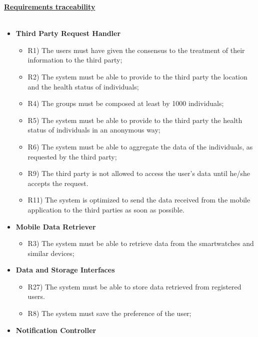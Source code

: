 	\underline{\textbf{Requirements traceability}}\\\\
	\begin{itemize}
		\item \textbf{Third Party Request Handler}
		\begin{itemize}
			\item R1) The users must have given the consensus to the treatment of their information to the third party;\\
			\item R2) The system must be able to provide to the third party the location and the health status of individuals;
			\item R4) The groups must be composed at least by 1000 individuals;\\
			\item R5) The system must be able to provide to the third party the health status of individuals in an anonymous way;\\
			\item R6) The system must be able to aggregate the data of the individuals, as requested by the third party;\\
			\item R9) The third party is not allowed to access the user’s data until he/she accepts the request.\\
			\item R11) The system is optimized to send the data received from the mobile application to the third parties as soon as possible.\\
		\end{itemize}
		\item \textbf{Mobile Data Retriever}
		\begin{itemize}
			\item R3) The system must be able to retrieve data from the smartwatches and similar devices;\\
		\end{itemize}
		\item \textbf{Data and Storage Interfaces}
		\begin{itemize}
			\item R27) The system must be able to store data retrieved from registered users.\\
			\item R8) The system must save the preference of the user;\\
		\end{itemize}
		\item \textbf{Notification Controller}

\end{itemize}
